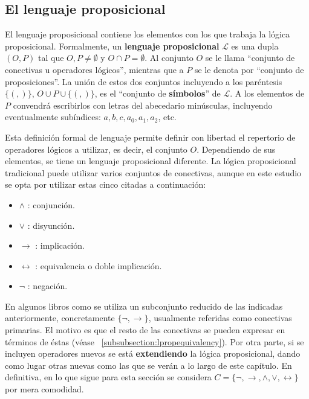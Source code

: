 \subsection{El lenguaje proposicional}\label{subsection:lproplenguaje}
El lenguaje proposicional contiene los elementos con los que trabaja la lógica proposicional. Formalmente, un \textbf{lenguaje proposicional} $\mathcal{L}$ es una dupla $(O,P)$ tal que $O,P \neq \emptyset$ y $O \cap P = \emptyset$. Al conjunto $O$ se le llama ``conjunto de conectivas u operadores lógicos'', mientras que a $P$ se le denota por ``conjunto de proposiciones''. La unión de estos dos conjuntos incluyendo a los paréntesis $\lbrace (,) \rbrace$, $O \cup P \cup \lbrace (,) \rbrace$, es el ``conjunto de \textbf{símbolos}'' de $\mathcal{L}$. A los elementos de $P$ convendrá escribirlos con letras del abecedario minúsculas, incluyendo eventualmente subíndices: $a,b,c,a_0,a_1,a_2$, etc.

Esta definición formal de lenguaje permite definir con libertad el repertorio de operadores lógicos a utilizar, es decir, el conjunto $O$. Dependiendo de sus elementos, se tiene un lenguaje proposicional diferente. La lógica proposicional tradicional puede utilizar varios conjuntos de conectivas, aunque en este estudio se opta por utilizar estas cinco citadas a continuación:

\begin{itemize}
    \item $\land$ : conjunción.
    \item $\lor$ : disyunción.
    \item $\rightarrow$ : implicación.
    \item $\leftrightarrow$ : equivalencia o doble implicación.
    \item $\neg$ : negación.
\end{itemize}

En algunos libros como \cite[Capítulo 8]{monk1976mathematical} se utiliza un subconjunto reducido de las indicadas anteriormente, concretamente $\lbrace \neg, \rightarrow \rbrace$, usualmente referidas como conectivas primarias. El motivo es que el resto de las conectivas se pueden expresar en términos de éstas (véase ~\ref{subsubsection:lpropequivalency}). Por otra parte, si se incluyen operadores nuevos se está \textbf{extendiendo} la lógica proposicional, dando como lugar otras nuevas como las que se verán a lo largo de este capítulo. En definitiva, en lo que sigue para esta sección se considera $C = \lbrace \neg, \rightarrow, \land, \lor, \leftrightarrow \rbrace$ por mera comodidad.

